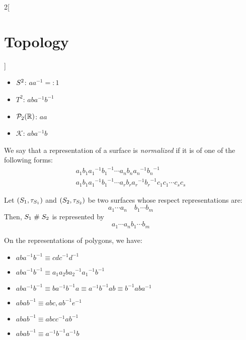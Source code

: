 \documentclass[../../../main_math.tex]{subfiles}
\begin{document}
\begin{multicols}{2}[\section{Topology}]
\begin{proposition}
\begin{itemize}
      \item $\S^2$: $aa^{-1}=:1$
      \item $T^2$: $aba^{-1}b^{-1}$
      \item $\mathcal{P}_2(\RR)$: $aa$
      \item $\mathcal{K}$: $aba^{-1}b$
    \end{itemize}
  \end{proposition}
  \begin{center}
    \begin{minipage}{\linewidth}
      \centering
      
    \end{minipage}
  \end{center}
  \begin{definition}
    We say that a representation of a surface is \emph{normalized} if it is of one of the following forms:
    \begin{gather*}
      a_1b_1{a_1}^{-1}{b_1}^{-1}\cdots a_nb_n{a_n}^{-1}{b_n}^{-1}\\
      a_1b_1{a_1}^{-1}{b_1}^{-1}\cdots a_rb_r{a_r}^{-1}{b_r}^{-1}c_1c_1\cdots c_sc_s
    \end{gather*}
  \end{definition}
  \begin{proposition}
    Let $(S_1,\topo_{S_1})$ and $(S_2,\topo_{S_2})$ be two surfaces whose respect representations are: $$a_1\cdots a_n\quad b_1\cdots b_m$$
    Then, $S_1\conn S_2$ is represented by $$a_1\cdots a_nb_1\cdots b_m$$
  \end{proposition}
  \begin{proposition}
    On the representations of polygons, we have:
    \begin{itemize}
      \item $aba^{-1}b^{-1}\equiv cdc^{-1}d^{-1}$
      \item $aba^{-1}b^{-1}\equiv a_1a_2b{a_2}^{-1}{a_1}^{-1}b^{-1}$
      \item $aba^{-1}b^{-1}\equiv ba^{-1}b^{-1}a\equiv a^{-1}b^{-1}ab\equiv b^{-1}aba^{-1}$
      \item $abab^{-1}\equiv abc, ab^{-1}e^{-1}$
      \item $abab^{-1}\equiv abcc^{-1}ab^{-1}$
      \item $abab^{-1}\equiv a^{-1}b^{-1}a^{-1}b$
    \end{itemize}

\end{proposition}
\end{multicols}
\end{document}
